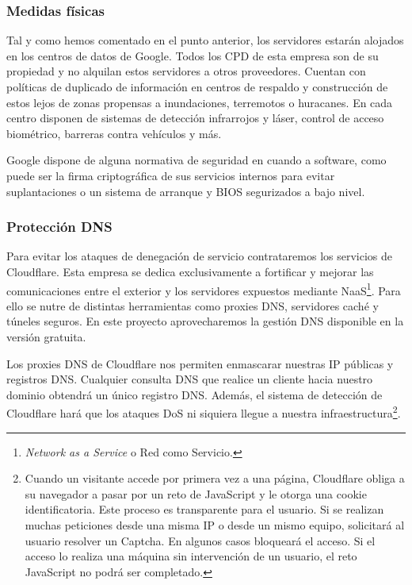 \subsubsection{Medidas físicas}
Tal y como hemos comentado en el punto anterior, los servidores estarán alojados en los centros de datos de Google. Todos los CPD de esta empresa son de su propiedad y no alquilan estos servidores a otros proveedores\cite{GCPSecurity}. Cuentan con políticas de duplicado de información en centros de respaldo y construcción de estos lejos de zonas propensas a inundaciones, terremotos o huracanes. En cada centro disponen de sistemas de detección infrarrojos y láser, control de acceso biométrico, barreras contra vehículos y más\cite{GoogleWhitepaper}.


Google dispone de alguna normativa de seguridad en cuando a software, como puede ser la firma criptográfica de sus servicios internos para evitar suplantaciones o un sistema de arranque y BIOS segurizados a bajo nivel.

\subsubsection{Protección DNS}

Para evitar los ataques de denegación de servicio contrataremos los servicios de Cloudflare. Esta empresa se dedica exclusivamente a fortificar y mejorar las comunicaciones entre el exterior y los servidores expuestos mediante NaaS\footnote{\textit{Network as a Service} o Red como Servicio.}. Para ello se nutre de distintas herramientas como proxies DNS, servidores caché y túneles seguros. En este proyecto aprovecharemos la gestión DNS disponible en la versión gratuita.

Los proxies DNS de Cloudflare nos permiten enmascarar nuestras IP públicas y registros DNS. Cualquier consulta DNS que realice un cliente hacia nuestro dominio obtendrá un único registro DNS. Además, el sistema de detección de Cloudflare hará que los ataques DoS ni siquiera llegue a nuestra infraestructura\footnote{Cuando un visitante accede por primera vez a una página, Cloudflare  obliga a su navegador a pasar por un reto de JavaScript y le otorga una cookie identificatoria. Este proceso es transparente para el usuario. Si se realizan muchas peticiones desde una misma IP o desde un mismo equipo, solicitará al usuario resolver un Captcha. En algunos casos bloqueará el acceso. Si el acceso lo realiza una máquina sin intervención de un usuario, el reto JavaScript no podrá ser completado.}.

